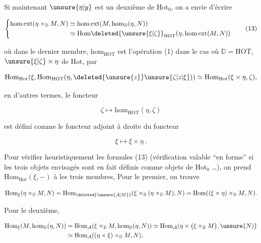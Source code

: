 
Si maintenant $\unsure{\eta|y}$ est un deuxième  de $\mathrm{Hot}_0$, on a envie d'écrire

\[
\left\{\begin{aligned}
\mathrm{hom\,ext}(\eta\times_{\mathbb D}M,N)&\simeq\mathrm{hom\,ext}(M,\mathrm{hom}_{\mathbb D}(\eta,N))\\
&\simeq\mathrm{Hom}\deleted{\unsure{\xi|\zeta}}_{\mathrm{HOT}}(\eta,\mathrm{hom\,ext}(M,N))
\end{aligned}\right.\tag*{(13)}
\]

où dans le dernier membre, $\mathrm{hom}_{\mathrm{HOT}}$ est l'opération (1) dans le cas où $\mathbb D=\mathrm{HOT}$,  $\unsure{\xi|\zeta}\times\eta$ de $\mathrm{Hot}$, par

\[\mathrm{Hom}_{\mathrm{Hot}}(\xi,\mathrm{Hom}_{\mathrm{HOT}}(\eta,\deleted{\unsure{z}}\unsure{\zeta|z|\xi}))\simeq\mathrm{Hom}_{\mathrm{Hot}}(\xi\times\eta,\zeta),\]

en d'autres termes,  le foncteur

\[\zeta\longmapsto\mathrm{hom}_{\mathrm{HOT}}(\eta,\zeta)\]

est défini comme le foncteur adjoint à droite du foncteur

\[\xi\longmapsto\xi\times\eta\ .\]

Pour vérifier heuristiquement les formules (13) (vérification valable ``en forme'' si les trois objets envisagés sont en fait définis comme objets de $\mathrm{Hot}_0$ \dots), on prend $\mathrm{Hom}_{\mathrm{Hot}}(\xi,-)$ à   les trois membres,  Pour le premier, on trouve

\[\mathrm{Hom}_{\xi}(\eta\times_{\mathbb D}M,N)=\mathrm{Hom}_{\deleted{\unsure{\mathcal A|M}}}(\xi\times_{\mathbb D}(\eta\times_{\mathbb D}M),N)=\mathrm{Hom}((\xi\times\eta)\times_{\mathbb D}M,N).\]

Pour le deuxième,

\[
\begin{aligned}
\mathrm{Hom}_{\xi}(M,\mathrm{hom}_{\mathbb D}(\eta,N))&=\mathrm{Hom}_{\mathcal A}(\xi\times_{\mathbb D}M,\mathrm{hom}_{\mathbb D}(\eta,N))\simeq\mathrm{Hom}_{\mathcal A}(\eta\times\bigl(\xi\times_{\mathbb D}M\bigr),\unsure{N)}\\
&\simeq\mathrm{Hom}_{\mathcal A}((\eta\times\xi)\times_{\mathbb D}M,N),
\end{aligned}
\]

